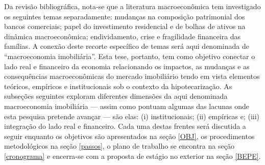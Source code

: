 Da revisão bibliográfica, nota-se que a literatura macroeconômica tem investigado os seguintes temas separadamente:  
    mudanças na composição patrimonial dos bancos comerciais; 
    papel do investimento residencial e de bolhas de ativos na dinâmica macroeconômica;
    endividamento, crise  e fragilidade financeira das famílias.
A conexão deste recorte específico de temas será aqui denominada de ``macroeconomia imobiliária''.
Esta tese, portanto, tem como objetivo conectar o lado real e financeiro da economia relacionando os impactos, as mudanças e as consequências macroeconômicas do mercado imobiliário tendo em vista elementos teóricos, empíricos e institucionais sob o contexto da hipotecarização. %
As subseções seguintes exploram diferentes dimensões da aqui denominada macroeconomia imobiliária --- assim como pontuam algumas das lacunas onde esta pesquisa pretende avançar --- são elas: (i) institucionais; (ii) empíricas e; (iii) integração do lado real e financeiro.
Cada uma destas frentes será discutida a seguir enquanto os objetivos são apresentados na seção \ref{OBJ}, os procedimentos metodológicos na seção \ref{passos},  o plano de trabalho  se encontra na seção \ref{cronograma} e encerra-se com a proposta de estágio no exterior na seção \ref{BEPE}.

